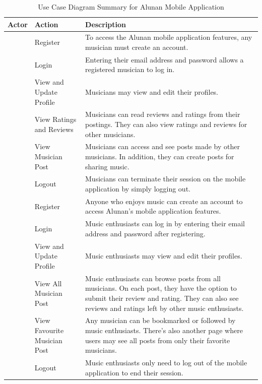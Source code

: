 \begin{table}[ht]
    \centering
    \caption{Use Case Diagram Summary for Alunan Mobile Application}
    \begin{tabular}
        {|>{\raggedright}p{2cm}|>{\raggedright}p{4cm}|>{\raggedright\arraybackslash}p{7cm}|}
    \hline
    \textbf{Actor} & \textbf{Action} & \textbf{Description} \\
    \hline
    \multirow{6}{2cm}{\vspace{-4cm}Musician} & Register & To access the Alunan mobile application features, any musician must create an account. \\
    \cline{2-3}
     & Login & Entering their email address and password allows a registered musician to log in. \\
    \cline{2-3}
     & View and Update Profile & Musicians may view and edit their profiles. \\
    \cline{2-3}
     & View Ratings and Reviews & Musicians can read reviews and ratings from their postings. They can also view ratings and reviews for other musicians. \\
    \cline{2-3}
     & View Musician Post & Musicians can access and see posts made by other musicians. In addition, they can create posts for sharing music. \\
    \cline{2-3}
     & Logout & Musicians can terminate their session on the mobile application by simply logging out. \\
    \hline
    \multirow{6}{2cm}{\vspace{-5cm}Enthusiast} & Register & Anyone who enjoys music can create an account to access Alunan's mobile application features. \\
    \cline{2-3}
     & Login & Music enthusiasts can log in by entering their email address and password after registering. \\
    \cline{2-3}
     & View and Update Profile & Music enthusiasts may view and edit their profiles. \\
    \cline{2-3}
     & View All Musician Post & Music enthusiasts can browse posts from all musicians. On each post, they have the option to submit their review and rating. They can also see reviews and ratings left by other music enthusiasts. \\
    \cline{2-3}
     & View Favourite Musician Post & Any musician can be bookmarked or followed by music enthusiasts. There's also another page where users may see all posts from only their favorite musicians. \\
    \cline{2-3}
     & Logout & Music enthusiasts only need to log out of the mobile application to end their session. \\
    \hline
    \end{tabular}
\end{table}
\pagebreak


